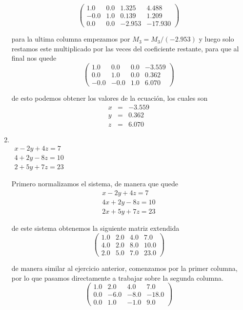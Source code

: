 \documentclass[11pt]{article}
\begin{document}
\begin{multicols}{2}
\begin{enumerate}[\bf{Sistema} 1]
			$$\left(\begin{array}{rrrr}
				1.0 & 0.0 & 1.325 & 4.488 \\
				-0.0 & 1.0 & 0.139 & 1.209 \\
				0.0 & 0.0 & -2.953 & -17.930
			\end{array}\right)$$
			
			
			para la ultima columna empezamos por $M_3 = M_3/(-2.953)$ y luego solo restamos este multiplicado por las veces del coeficiente restante, para que al final nos quede
			$$\left(\begin{array}{rrrr}
				1.0 & 0.0 & 0.0 & -3.559 \\
				0.0 & 1.0 & 0.0 & 0.362 \\
				-0.0 & -0.0 & 1.0 & 6.070
			\end{array}\right)$$
			
			de esto podemos obtener los valores de la ecuaci\'on, los cuales son
			\begin{eqnarray*}
				x &=& -3.559 \\
				y &=&  0.362 \\
				z &=&  6.070
			\end{eqnarray*}	

		\item
			\ \\ $\begin{matrix}
				x - 2y + 4z =  7 \\
				4 + 2y - 8z = 10 \\
				2 + 5y + 7z = 23
			\end{matrix}$
			
			\par Primero normalizamos el sistema, de manera que quede		
			$$\begin{matrix}
				 x - 2y + 4z =  7 \\
				4x + 2y - 8z = 10 \\
				2x + 5y + 7z = 23
			\end{matrix}$$
			
			de este sistema obtenemos la siguiente matriz extendida
			$$\left(\begin{array}{rrrr}
					1.0 & 2.0 & 4.0 & 7.0 \\
					4.0 & 2.0 & 8.0 & 10.0 \\
					2.0 & 5.0 & 7.0 & 23.0
				\end{array}\right)$$

			de manera similar al ejercicio anterior, comenzamos por la primer columna, por lo que pasamos directamente a trabajar sobre la segunda columna. 
			$$\left(\begin{array}{rrrr}
				1.0 & 2.0 & 4.0 & 7.0 \\
				0.0 & -6.0 & -8.0 & -18.0 \\
				0.0 & 1.0 & -1.0 & 9.0
			\end{array}\right)$$ 
			

\end{enumerate}
\end{multicols}
\end{document}
